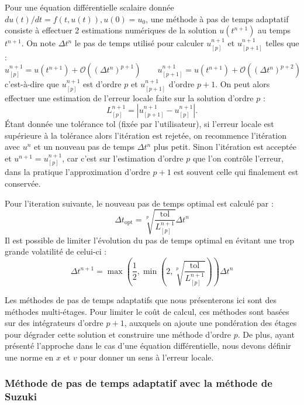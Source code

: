 Pour une équation différentielle scalaire donnée $du(t)/dt = f(t, u(t)), u(0)=u_0$, une méthode à pas de temps adaptatif consiste à effectuer 2 estimations numériques de la solution $u(t^{n+1})$ au temps $t^{n+1}$. On note $\Delta t^n$ le pas de temps utilisé pour calculer $u^{n+1}_{[p]}$ et $u^{n+1}_{[p+1]}$ telles que :
$$
  u^{n+1}_{[p]} = u(t^{n+1}) + \mathcal{O}((\Delta t^n)^{p+1}) \qquad u^{n+1}_{[p+1]} = u(t^{n+1}) + \mathcal{O}((\Delta t^n)^{p+2})
$$
c'est-à-dire que $u^{n+1}_{[p]}$ est d'ordre $p$ et $u^{n+1}_{[p+1]}$ d'ordre $p+1$. On peut alors effectuer une estimation de l'erreur locale faite sur la solution d'ordre $p$ :
\begin{equation}
  L_{[p]}^{n+1} =  |u^{n+1}_{[p+1]} - u^{n+1}_{[p]}|. 
  \label{eq:Lerror}
\end{equation}
Étant donnée une tolérance $\text{tol}$ (fixée par l'utilisateur), si l'erreur locale est supérieure à la tolérance alors l'itération est rejetée, on recommence l'itération avec $u^n$ et un nouveau pas de temps $\Delta t^n$ plus petit. Sinon l'itération est acceptée et $u^{n+1} = u^{n+1}_{[p]}$, car c'est sur l'estimation d'ordre $p$ que l'on contrôle l'erreur, dans la pratique l'approximation d'ordre $p+1$ est souvent celle qui finalement est conservée.

Pour l'iteration suivante, le nouveau pas de temps optimal est calculé par :
\begin{equation}
  \Delta t_\text{opt} = \sqrt[p]{\frac{\text{tol}}{L_{[p]}^{n+1}}}\Delta t^n
  \label{eq:dtopt}
\end{equation}
Il est possible de limiter l'évolution du pas de temps optimal en évitant une trop grande volatilité de celui-ci :
$$
  \Delta t^{n+1} = \max\left(\frac{1}{2},\min\left(2,\sqrt[p]{\frac{\text{tol}}{L_{[p]}^{n+1}}}\right)\right)\Delta t^n
$$

Les méthodes de pas de temps adaptatifs que nous présenterons ici sont des méthodes multi-étages. Pour limiter le coût de calcul, ces méthodes sont basées sur des intégrateurs d'ordre $p+1$, auxquels on ajoute une pondération des étages pour dégrader cette solution et construire une méthode d'ordre $p$. De plus, ayant présenté l'approche dans le cas d'une équation différentielle, nous devons définir une norme en $x$ et $v$ pour donner un sens à l'erreur locale.  


\subsubsection{Méthode de pas de temps adaptatif avec la méthode de Suzuki}

